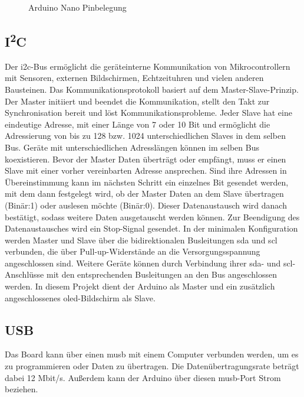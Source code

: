 	\begin{figure}
		
		\caption{Arduino Nano Pinbelegung \cite{Ard.2024}}
		\label{arduinopinout}
	\end{figure}

\subsection{I\textsuperscript{2}C}

Der \ac{i2c}-Bus ermöglicht die geräteinterne Kommunikation von Mikrocontrollern mit Sensoren, externen Bildschirmen, Echtzeituhren und vielen anderen Bausteinen. Das Kommunikationsprotokoll basiert auf dem Master-Slave-Prinzip. Der Master initiiert und beendet die Kommunikation, stellt den Takt zur Synchronisation bereit und löst Kommunikationsprobleme. Jeder Slave hat eine eindeutige Adresse, mit einer Länge von 7 oder 10 Bit und ermöglicht die Adressierung von bis zu 128 bzw. 1024 unterschiedlichen Slaves in dem selben Bus. Geräte mit unterschiedlichen Adresslängen können im selben Bus koexistieren. Bevor der Master Daten überträgt oder empfängt, muss er einen Slave mit einer vorher vereinbarten Adresse ansprechen.\cite{Meroth.2021}\cite{STM1.2015}\cite{Bernstein.2020} Sind ihre Adressen in Übereinstimmung kann im nächsten Schritt ein einzelnes Bit gesendet werden, mit dem dann festgelegt wird, ob der Master Daten an dem Slave übertragen (Binär:1) oder auslesen möchte (Binär:0). Dieser Datenaustausch wird danach bestätigt, sodass weitere Daten ausgetauscht werden können. Zur Beendigung des Datenaustausches wird ein Stop-Signal gesendet.\cite{Gehrke.2022} In der minimalen Konfiguration werden Master und Slave über die bidirektionalen Busleitungen \ac{sda} und \ac{scl} verbunden, die über Pull-up-Widerstände an die Versorgungsspannung angeschlossen sind. Weitere Geräte können durch Verbindung ihrer \ac{sda}- und \ac{scl}-Anschlüsse mit den entsprechenden Busleitungen an den Bus angeschlossen werden.\cite{Meroth.2021} In diesem Projekt dient der Arduino als Master und ein zusätzlich angeschlossenes \ac{oled}-Bildschirm als Slave.

\subsection{USB}

Das Board kann über einen \ac{musb} mit einem Computer verbunden werden, um es zu programmieren oder Daten zu übertragen. Die Datenübertragungsrate beträgt dabei 12 Mbit/s. Außerdem kann der Arduino über diesen \ac{musb}-Port Strom beziehen.

